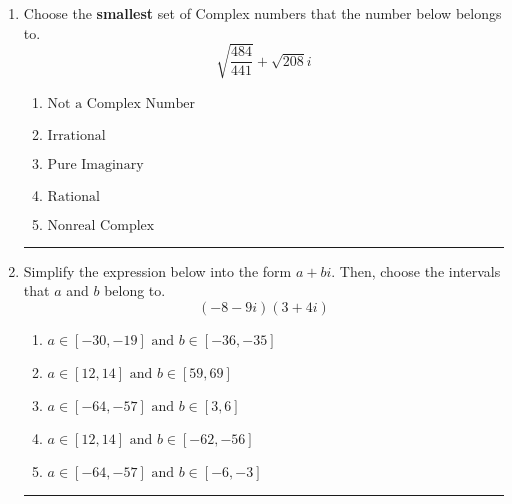 \documentclass[14pt]{extbook}
\newcommand{\litem}[1]{\item#1\hspace*{-1cm}\rule{\textwidth}{0.4pt}}
\begin{document}
\begin{enumerate}
{\begin{enumerate}[label=\Alph*.]
\end{enumerate} }
\litem{
Choose the \textbf{smallest} set of Complex numbers that the number below belongs to.\[ \sqrt{\frac{484}{441}}+\sqrt{208} i \]\begin{enumerate}[label=\Alph*.]
\item \( \text{Not a Complex Number} \)
\item \( \text{Irrational} \)
\item \( \text{Pure Imaginary} \)
\item \( \text{Rational} \)
\item \( \text{Nonreal Complex} \)

\end{enumerate} }
\litem{
Simplify the expression below into the form $a+bi$. Then, choose the intervals that $a$ and $b$ belong to.\[ (-8 - 9 i)(3 + 4 i) \]\begin{enumerate}[label=\Alph*.]
\item \( a \in [-30, -19] \text{ and } b \in [-36, -35] \)
\item \( a \in [12, 14] \text{ and } b \in [59, 69] \)
\item \( a \in [-64, -57] \text{ and } b \in [3, 6] \)
\item \( a \in [12, 14] \text{ and } b \in [-62, -56] \)
\item \( a \in [-64, -57] \text{ and } b \in [-6, -3] \)

\end{enumerate} }
\end{enumerate}
\end{document}
